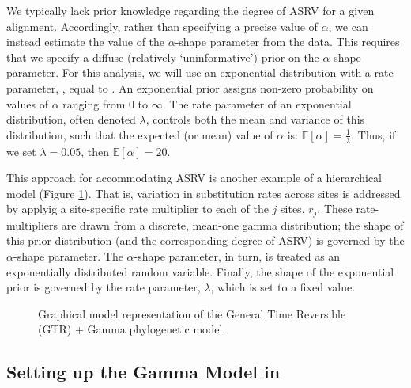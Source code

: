We typically lack prior knowledge regarding the degree of ASRV for a given alignment.
Accordingly, rather than specifying a precise value of $\alpha$, we can instead estimate the value of the $\alpha$-shape parameter from the data.
This requires that we specify a diffuse (relatively `uninformative') prior on the $\alpha$-shape parameter.
For this analysis, we will use an exponential distribution with a rate parameter, , equal to .
An exponential prior assigns non-zero probability on values of $\alpha$ ranging from 0 to $\infty$. 
The rate parameter of an exponential distribution, often denoted $\lambda$, controls both the mean and variance of this distribution, such that the expected (or mean) value of $\alpha$ is:
$\mathbb{E}[\alpha] = \frac{1}{\lambda}.$
Thus, if we set $\lambda=0.05$, then $\mathbb{E}[\alpha] = 20$.

This approach for accommodating ASRV is another example of a hierarchical model (Figure \ref{fig:gtrg}).
That is, variation in substitution rates across sites is addressed by applyig a site-specific rate multiplier to each of the $j$ sites, $r_j$.
These rate-multipliers are drawn from a discrete, mean-one gamma distribution; the shape of this prior distribution (and the corresponding degree of ASRV) is governed by the $\alpha$-shape parameter.
The $\alpha$-shape parameter, in turn, is treated as an exponentially distributed random variable.
Finally, the shape of the exponential prior is governed by the rate parameter, $\lambda$, which is set to a fixed value.   

\begin{figure}[h!]
\centering
{}
\caption{\small Graphical model representation of the General Time Reversible (GTR) + Gamma phylogenetic model.}
\label{fig:gtrg}
\end{figure}

\subsection{Setting up the Gamma Model in \RevBayes}

